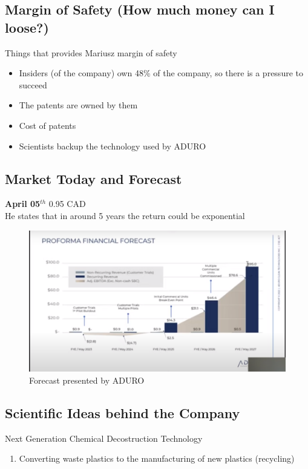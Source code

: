 \documentclass{article}
\begin{document}
\subsection{Margin of Safety (How much money can I loose?)}
Things that provides Mariusz margin of safety
\begin{itemize}
  \item Insiders (of the company) own 48\% of the company, so there is a
    pressure to succeed
  \item The patents are owned by them
  \item Cost of patents
  \item Scientists backup the technology used by ADURO

\end{itemize}

\subsection{Market Today and Forecast}
\textbf{April 05$^{th}$} 0.95 CAD\\
  He states that in around 5 years the return could be exponential
  
\begin{figure}[h]

\begin{center}
  \includegraphics[scale=0.3]{figures/forecast.png}
\end{center}
\caption{Forecast presented by ADURO}
\label{fig:forecast}
\end{figure}

\subsection{Scientific Ideas behind the Company}

Next Generation Chemical Decostruction Technology
\begin{enumerate}
  \item Converting waste plastics to the manufacturing of new plastics (recycling)
\end{enumerate}
\end{document}
